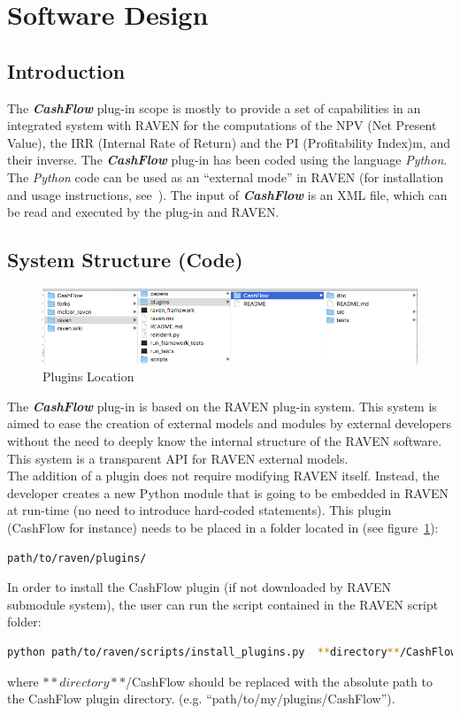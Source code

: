 \section{Software Design}
\subsection{Introduction}
The \textit{\textbf{CashFlow}} plug-in scope is mostly to provide a set of capabilities in an integrated system with RAVEN
for the computations of the NPV (Net Present Value), the IRR (Internal Rate of Return) and the PI (Profitability Index)m, and their 
inverse. 
The \textit{\textbf{CashFlow}} plug-in has been coded using the language \emph{Python}. The \emph{Python}
 code can be used as an ``external mode'' in RAVEN (for installation and usage instructions, see~\cite{RAVENuserManual}).
The input of  \textit{\textbf{CashFlow}} is an XML file, which can be read and executed by the plug-in and RAVEN.


\subsection{System Structure (Code)}
\begin{figure}
\centering
\includegraphics[width=1.0\textwidth]{pics/plugins_location.png}
\caption{Plugins Location}
\label{fig:pluginsLocation}
\end{figure}

The  \textit{\textbf{CashFlow}} plug-in is based on the RAVEN plug-in system. This system is aimed to ease the creation
of external models and modules by external developers without the need to deeply know the internal structure
of the RAVEN software. This system is a transparent API for RAVEN external models.
\\The addition of a plugin does not require modifying RAVEN itself. 
Instead, the developer creates a new Python module that is going to be embedded
 in RAVEN at run-time (no need to introduce  hard-coded statements).
 This plugin (CashFlow for instance) needs to be placed in a folder  located in (see figure~\ref{fig:pluginsLocation}):
\begin{lstlisting}[language=bash]
 path/to/raven/plugins/
\end{lstlisting}
In order to install the CashFlow plugin (if not downloaded by RAVEN submodule system),
 the user can run the script contained in the RAVEN script folder:
\begin{lstlisting}[language=bash]
 python path/to/raven/scripts/install_plugins.py  **directory**/CashFlow
\end{lstlisting}
where  $**directory**$/CashFlow should be replaced with the absolute path to the CashFlow plugin directory.
(e.g. ``path/to/my/plugins/CashFlow''). 

